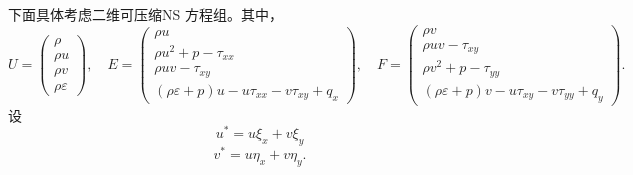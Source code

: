 \documentclass[12pt]{article}
\begin{document}
下面具体考虑二维可压缩NS 方程组。其中，
\begin{equation}
	U=
	\begin{pmatrix}
		\rho   \\
		\rho u \\
		\rho v \\
		\rho \varepsilon
	\end{pmatrix},
	\quad E=
	\begin{pmatrix}
		\rho u                  \\
		\rho u^{2}+p-\tau_{x x} \\
		\rho u v-\tau_{x y}     \\
		(\rho \varepsilon+p) u-u \tau_{x x}-v \tau_{x y}+q_{x}
	\end{pmatrix},\quad
	F=\begin{pmatrix}
		\rho v                  \\
		\rho u v-\tau_{x y}     \\
		\rho v^{2}+p-\tau_{y y} \\
		(\rho \varepsilon+p) v-u \tau_{x y}-v \tau_{y y}+q_{y}
	\end{pmatrix}.
\end{equation}
设
\begin{equation}
	u^{*}=u \xi_{x}+v \xi_{y}
\end{equation}
\begin{equation}
	v^{*}=u \eta_{x}+v \eta_{y} .
\end{equation}
\end{document}
